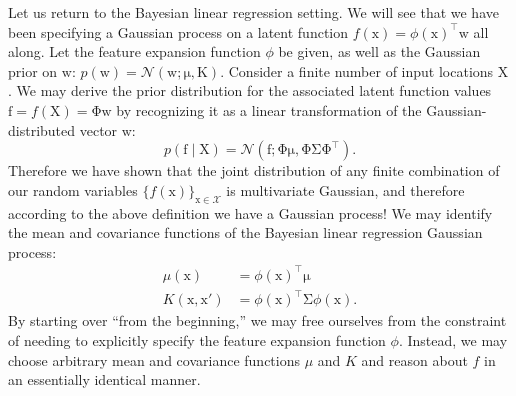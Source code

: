 \documentclass{article}
\newcommand{\given}{\mid}
\newcommand{\mc}[1]{\mathcal{#1}}
\newcommand{\trans}{^\top}
\newcommand{\mat}[1]{\bm{\mathrm{#1}}}
\renewcommand{\vec}[1]{\bm{\mathrm{#1}}}
\begin{document}
Let us return to the Bayesian linear regression setting.  We will see
that we have been specifying a Gaussian process on a latent function
$f(\vec{x}) = \phi(\vec{x})\trans \vec{w}$ all along.  Let the feature
expansion function $\phi$ be given, as well as the Gaussian prior on
$\vec{w}$: $p(\vec{w}) = \mc{N}(\vec{w}; \vec{\mu}, \mat{K})$.
Consider a finite number of input locations $\mat{X}$.  We may derive
the prior distribution for the associated latent function values
$\vec{f} = f(\mat{X}) = \mat{\Phi}\vec{w}$ by recognizing it as a
linear transformation of the Gaussian-distributed vector $\vec{w}$:
\begin{equation*}
  p(\vec{f} \given \mat{X})
  =
  \mc{N}(\vec{f}; \mat{\Phi}\vec{\mu}, \mat{\Phi}\mat{\Sigma}\mat{\Phi}\trans).
\end{equation*}
Therefore we have shown that the joint distribution of any finite
combination of our random variables $\{f(\vec{x})\}_{\vec{x} \in
  \mc{X}}$ is multivariate Gaussian, and therefore according to the
above definition we have a Gaussian process!  We may identify the mean
and covariance functions of the Bayesian linear regression Gaussian
process:
\begin{align*}
  \mu(\vec{x})
  &=
  \phi(\vec{x})\trans
  \vec{\mu}
  \\
  K(\vec{x}, \vec{x}')
  &=
  \phi(\vec{x})\trans
  \mat{\Sigma}
  \phi(\vec{x}).
\end{align*}
By starting over ``from the beginning,'' we may free ourselves from
the constraint of needing to explicitly specify the feature expansion
function $\phi$.  Instead, we may choose arbitrary mean and covariance
functions $\mu$ and $K$ and reason about $f$ in an essentially
identical manner.
\end{document}
